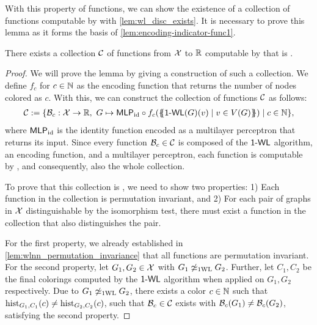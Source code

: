 With this property of \wlnn functions, we can show the existence of a \wldisc collection of functions computable by \wlnn with \cref{lem:wl_disc_exists}. It is necessary to prove this lemma as it forms the basis of \cref{lem:encoding-indicator-func1}.
\begin{lemma}\label{lem:wl_disc_exists}
    There exists a collection $\mathcal{C}$ of functions from $\mathcal{X}$ to $\mathbb{R}$ computable by \wlnn that is \wldisc.
\end{lemma}

\begin{proof}
    We will prove the lemma by giving a construction of such a collection.
    We define $f_c$ for $c \in \mathbb{N}$ as the encoding function that returns the number of nodes colored as $c$. With this, we can construct the collection of functions $\mathcal{C}$ as follows:
    \begin{align*}
        \mathcal{C} := \{ \mathcal{B}_c: \mathcal{X} \rightarrow \mathbb{R}, \ G \mapsto \textsf{MLP}_\text{id} \circ f_c (\{\!\!\{ \textsf{1-WL}(G)(v) \mid v \in V(G) \}\!\!\}) \mid c \in \mathbb{N}\},
    \end{align*}
    where $\textsf{MLP}_\text{id}$ is the identity function encoded as a multilayer perceptron that returns its input. Since every function $\mathcal{B}_c \in \mathcal{C}$ is composed of the $\textsf{1-WL}$ algorithm, an encoding function, and a multilayer perceptron, each function is computable by \wlnn, and consequently, also the whole collection.
    
    To prove that this collection is \wldisc, we need to show two properties: 1) Each function in the collection is permutation invariant, and 2) For each pair of graphs in $\mathcal{X}$ distinguishable by the \wl isomorphism test, there must exist a function in the collection that also distinguishes the pair. 
    
    For the first property, we already established in \cref{lem:wlnn_permutation_invariance} that all \wlnn functions are permutation invariant. For the second property, let $G_1, G_2 \in \mathcal{X}$ with $G_1 \not\simeq_{\text{1WL}} G_2$. Further, let $C_1, C_2$ be the final colorings computed by the $\textsf{1-WL}$ algorithm when applied on $G_1, G_2$ respectively. Due to $G_1 \not\simeq_{\text{1WL}} G_2$, there exists a color $c \in \mathbb{N}$ such that $\operatorname{hist}_{G_1,C_1}(c) \neq \operatorname{hist}_{G_2,C_2}(c)$, such that $\mathcal{B}_c \in \mathcal{C}$ exists with $\mathcal{B}_c(G_1) \neq \mathcal{B}_c(G_2)$, satisfying the second property.
\end{proof}


